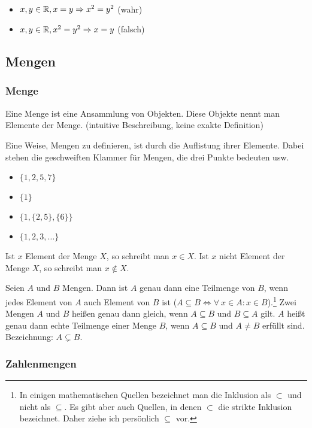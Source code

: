 \begin{bsp}\
	\begin{itemize}
		\item $ x,y \in \mathbb R, x = y \Rightarrow x^2 = y^2 $ (wahr)
		\item $ x,y \in \mathbb R, x^2 = y^2 \Rightarrow x = y $ (falsch)	
	\end{itemize}
\end{bsp}

\clearpage
\subsection{Mengen}

\subsubsection{Menge}

Eine Menge ist eine Ansammlung von Objekten. Diese Objekte nennt man Elemente der Menge. (intuitive Beschreibung, keine exakte Definition)

Eine Weise, Mengen zu definieren, ist durch die Auflistung ihrer Elemente. Dabei stehen die geschweiften Klammer für Mengen, die drei Punkte bedeuten \glqq usw\grqq.
\begin{itemize}
	\item $ \{1,2,5,7\} $
	\item $ \{1\} $
	\item $ \{1,\{2,5\},\{6\}\} $
	\item $ \{1,2,3,\ldots\} $
\end{itemize}
Ist $ x $ Element der Menge $ X $, so schreibt man $ x \in X $. Ist $ x $ nicht Element der Menge $X$, so schreibt man $ x \notin X $.

Seien $ A $ und $ B $ Mengen. Dann ist $ A $ genau dann eine Teilmenge von $ B $, wenn jedes Element von $ A $ auch Element von $ B $ ist ($ A \subseteq B \Leftrightarrow \forall\: x \in A : x \in B $).\footnote{In einigen mathematischen Quellen bezeichnet man die Inklusion als $ \subset $ und nicht als $ \subseteq $. Es gibt aber auch Quellen, in denen $ \subset $ die strikte Inklusion bezeichnet. Daher ziehe ich persönlich $ \subseteq $ vor.} Zwei Mengen $ A $ und $ B $ heißen genau dann gleich, wenn $ A \subseteq B $ und $ B \subseteq A $ gilt. $ A $ heißt genau dann echte Teilmenge einer Menge $ B $, wenn $ A \subseteq B $ und $ A \neq B $ erfüllt sind. Bezeichnung: $ A \varsubsetneq B $.

\subsubsection{Zahlenmengen}

